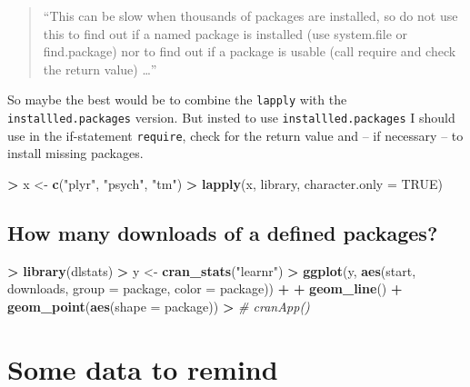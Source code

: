 \documentclass[]{book}
\newenvironment{Shaded}{\begin{snugshade}}{\end{snugshade}}
\newcommand{\KeywordTok}[1]{\textcolor[rgb]{0.13,0.29,0.53}{\textbf{#1}}}
\newcommand{\DataTypeTok}[1]{\textcolor[rgb]{0.13,0.29,0.53}{#1}}
\newcommand{\StringTok}[1]{\textcolor[rgb]{0.31,0.60,0.02}{#1}}
\newcommand{\CommentTok}[1]{\textcolor[rgb]{0.56,0.35,0.01}{\textit{#1}}}
\newcommand{\OtherTok}[1]{\textcolor[rgb]{0.56,0.35,0.01}{#1}}
\newcommand{\OperatorTok}[1]{\textcolor[rgb]{0.81,0.36,0.00}{\textbf{#1}}}
\newcommand{\NormalTok}[1]{#1}
\theoremstyle{definition}
\theoremstyle{definition}
\theoremstyle{definition}
\theoremstyle{remark}
\begin{document}
\begin{quote}
``This can be slow when thousands of packages are installed, so do not
use this to find out if a named package is installed (use system.file or
find.package) nor to find out if a package is usable (call require and
check the return value) \ldots{}''
\end{quote}

So maybe the best would be to combine the \texttt{lapply} with the
\texttt{installled.packages} version. But insted to use
\texttt{installled.packages} I should use in the if-statement
\texttt{require}, check for the return value and -- if necessary -- to
install missing packages.

\begin{Shaded}
\begin{Highlighting}[]
\OperatorTok{>}\StringTok{ }\NormalTok{x <-}\StringTok{ }\KeywordTok{c}\NormalTok{(}\StringTok{"plyr"}\NormalTok{, }\StringTok{"psych"}\NormalTok{, }\StringTok{"tm"}\NormalTok{)}
\OperatorTok{>}\StringTok{ }\KeywordTok{lapply}\NormalTok{(x, library, }\DataTypeTok{character.only =} \OtherTok{TRUE}\NormalTok{)}
\end{Highlighting}
\end{Shaded}

\subsection{How many downloads of a defined
packages?}\label{how-many-downloads-of-a-defined-packages}

\begin{Shaded}
\begin{Highlighting}[]
\OperatorTok{>}\StringTok{ }\KeywordTok{library}\NormalTok{(dlstats)}
\OperatorTok{>}\StringTok{ }\NormalTok{y <-}\StringTok{ }\KeywordTok{cran_stats}\NormalTok{(}\StringTok{"learnr"}\NormalTok{)}
\OperatorTok{>}\StringTok{ }\KeywordTok{ggplot}\NormalTok{(y, }\KeywordTok{aes}\NormalTok{(start, downloads, }\DataTypeTok{group =}\NormalTok{ package, }\DataTypeTok{color =}\NormalTok{ package)) }\OperatorTok{+}
\OperatorTok{+}\StringTok{         }\KeywordTok{geom_line}\NormalTok{() }\OperatorTok{+}\StringTok{ }\KeywordTok{geom_point}\NormalTok{(}\KeywordTok{aes}\NormalTok{(}\DataTypeTok{shape =}\NormalTok{ package))}
\OperatorTok{>}\StringTok{ }\CommentTok{# cranApp()}
\end{Highlighting}
\end{Shaded}

\section{Some data to remind}\label{some-data-to-remind}
\end{document}
